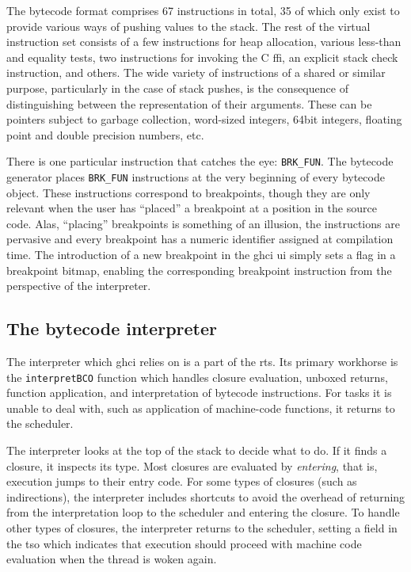 \documentclass[thesis=B,english]{FITthesis}[2019/12/23]
\begin{document}
The bytecode format comprises 67 instructions in total, 35 of which only exist
to provide various ways of pushing values to the stack. The rest of the virtual
instruction set consists of a few instructions for heap allocation, various
less-than and equality tests, two instructions for invoking the C
\acrshort{ffi}, an explicit stack check instruction, and others. The wide
variety of instructions of a shared or similar purpose, particularly in the
case of stack pushes, is the consequence of distinguishing between the
representation of their arguments. These can be pointers subject to garbage
collection, word-sized integers, 64bit integers, floating point and double
precision numbers, etc.

There is one particular instruction that catches the eye: \texttt{BRK\_FUN}.
The bytecode generator places \texttt{BRK\_FUN} instructions at the very
beginning of every bytecode object. These instructions correspond to
breakpoints, though they are only relevant when the user has ``placed'' a
breakpoint at a position in the source code. Alas, ``placing'' breakpoints is
something of an illusion, the instructions are pervasive and every breakpoint
has a numeric identifier assigned at compilation time. The introduction of a
new breakpoint in the \acrshort{ghci} \acrshort{ui} simply sets a flag in a
breakpoint bitmap, enabling the corresponding breakpoint instruction from the
perspective of the interpreter.


\subsection*{The bytecode interpreter}
The interpreter which \acrshort{ghci} relies on is a part of the
\acrshort{rts}. Its primary workhorse is the \texttt{interpretBCO} function
which handles closure evaluation, unboxed returns, function application, and
interpretation of bytecode instructions. For tasks it is unable to deal with,
such as application of machine-code functions, it returns to the scheduler.

The interpreter looks at the top of the stack to decide what to do. If it finds
a closure, it inspects its type. Most closures are evaluated by
\textit{entering}, that is, execution jumps to their entry code. For some types
of closures (such as indirections), the interpreter includes shortcuts to avoid
the overhead of returning from the interpretation loop to the scheduler and
entering the closure. To handle other types of closures, the interpreter
returns to the scheduler, setting a field in the \acrshort{tso} which indicates
that execution should proceed with machine code evaluation when the thread is
woken again.
\end{document}
